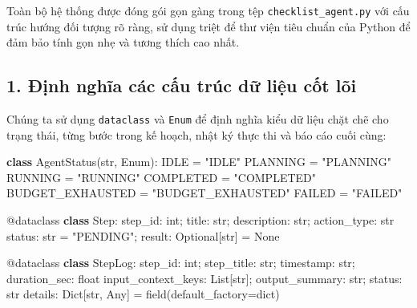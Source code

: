 \documentclass[]{article}
\newenvironment{Shaded}{}{}
\newcommand{\AttributeTok}[1]{\textcolor[rgb]{0.49,0.56,0.16}{#1}}
\newcommand{\DataTypeTok}[1]{\textcolor[rgb]{0.56,0.13,0.00}{#1}}
\newcommand{\KeywordTok}[1]{\textcolor[rgb]{0.00,0.44,0.13}{\textbf{#1}}}
\newcommand{\NormalTok}[1]{#1}
\newcommand{\OperatorTok}[1]{\textcolor[rgb]{0.40,0.40,0.40}{#1}}
\newcommand{\StringTok}[1]{\textcolor[rgb]{0.25,0.44,0.63}{#1}}
\begin{document}
Toàn bộ hệ thống được đóng gói gọn gàng trong tệp \texttt{checklist\_agent.py} với cấu trúc hướng đối tượng rõ ràng, sử dụng triệt để thư viện tiêu chuẩn của Python để đảm bảo tính gọn nhẹ và tương thích cao nhất.

\subsection{1. Định nghĩa các cấu trúc dữ liệu cốt lõi}
Chúng ta sử dụng \texttt{dataclass} và \texttt{Enum} để định nghĩa kiểu dữ liệu chặt chẽ cho trạng thái, từng bước trong kế hoạch, nhật ký thực thi và báo cáo cuối cùng:

\begin{Shaded}
\begin{Highlighting}[]
\KeywordTok{class}\NormalTok{ }\DataTypeTok{AgentStatus}\NormalTok{(}\DataTypeTok{str}\NormalTok{, }\DataTypeTok{Enum}\NormalTok{):}
\NormalTok{    IDLE }\OperatorTok{=}\NormalTok{ }\StringTok{"IDLE"}
\NormalTok{    PLANNING }\OperatorTok{=}\NormalTok{ }\StringTok{"PLANNING"}
\NormalTok{    RUNNING }\OperatorTok{=}\NormalTok{ }\StringTok{"RUNNING"}
\NormalTok{    COMPLETED }\OperatorTok{=}\NormalTok{ }\StringTok{"COMPLETED"}
\NormalTok{    BUDGET_EXHAUSTED }\OperatorTok{=}\NormalTok{ }\StringTok{"BUDGET_EXHAUSTED"}
\NormalTok{    FAILED }\OperatorTok{=}\NormalTok{ }\StringTok{"FAILED"}

\AttributeTok{@dataclass}
\KeywordTok{class}\NormalTok{ }\DataTypeTok{Step}\NormalTok{:}
\NormalTok{    step_id: }\DataTypeTok{int}\NormalTok{; title: }\DataTypeTok{str}\NormalTok{; description: }\DataTypeTok{str}\NormalTok{; action_type: }\DataTypeTok{str}
\NormalTok{    status: }\DataTypeTok{str} \OperatorTok{=}\NormalTok{ }\StringTok{"PENDING"}\NormalTok{; result: }\DataTypeTok{Optional}\NormalTok{[}\DataTypeTok{str}\NormalTok{] }\OperatorTok{=}\NormalTok{ }\DataTypeTok{None}

\AttributeTok{@dataclass}
\KeywordTok{class}\NormalTok{ }\DataTypeTok{StepLog}\NormalTok{:}
\NormalTok{    step_id: }\DataTypeTok{int}\NormalTok{; step_title: }\DataTypeTok{str}\NormalTok{; timestamp: }\DataTypeTok{str}\NormalTok{; duration_sec: }\DataTypeTok{float}
\NormalTok{    input_context_keys: }\DataTypeTok{List}\NormalTok{[}\DataTypeTok{str}\NormalTok{]; output_summary: }\DataTypeTok{str}\NormalTok{; status: }\DataTypeTok{str}
\NormalTok{    details: }\DataTypeTok{Dict}\NormalTok{[}\DataTypeTok{str}\NormalTok{, }\DataTypeTok{Any}\NormalTok{] }\OperatorTok{=}\NormalTok{ field(default_factory}\OperatorTok{=}\DataTypeTok{dict}\NormalTok{)}


\end{Highlighting}
\end{Shaded}
\end{document}
